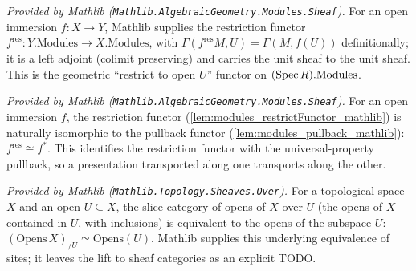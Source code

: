 \begin{lemma}
  \label{lem:modules_restrictFunctor_mathlib}
  \mathlibok
  \textit{Provided by Mathlib (\texttt{Mathlib.AlgebraicGeometry.Modules.Sheaf}).}
  For an open immersion \(f : X \to Y\), Mathlib supplies the restriction functor
  \(f^{\mathrm{res}} : Y.\mathrm{Modules} \to X.\mathrm{Modules}\), with
  \(\Gamma(f^{\mathrm{res}} M, U) = \Gamma(M, f(U))\) definitionally; it is a left adjoint (colimit
  preserving) and carries the unit sheaf to the unit sheaf. This is the geometric
  ``restrict to open \(U\)'' functor on \((\operatorname{Spec} R).\mathrm{Modules}\).
\end{lemma}

\begin{lemma}
  \label{lem:modules_restrictFunctorIsoPullback_mathlib}
  \mathlibok
  \textit{Provided by Mathlib (\texttt{Mathlib.AlgebraicGeometry.Modules.Sheaf}).}
  For an open immersion \(f\), the restriction functor (\cref{lem:modules_restrictFunctor_mathlib})
  is naturally isomorphic to the pullback functor (\cref{lem:modules_pullback_mathlib}):
  \(f^{\mathrm{res}} \cong f^{*}\). This identifies the restriction functor with the
  universal-property pullback, so a presentation transported along one transports along the other.
\end{lemma}






\begin{lemma}
  \label{lem:opens_overEquivalence_mathlib}
  \mathlibok
  \textit{Provided by Mathlib (\texttt{Mathlib.Topology.Sheaves.Over}).}
  For a topological space \(X\) and an open \(U \subseteq X\), the slice category of opens of
  \(X\) over \(U\) (the opens of \(X\) contained in \(U\), with inclusions) is equivalent to the
  opens of the subspace \(U\):
  \((\mathrm{Opens}\,X)_{/U} \simeq \mathrm{Opens}(U)\). Mathlib supplies this underlying
  equivalence of sites; it leaves the lift to sheaf categories as an explicit TODO.
\end{lemma}

